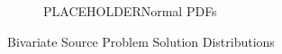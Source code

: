 \begin{figure}[h]
\begin{subfigure}[b]{0.45\textwidth}
   \caption{PLACEHOLDERNormal PDFs}
      \label{norm}
  \end{subfigure}
\caption{Bivariate Source Problem Solution Distributions}
\label{fig:2v sourcepdfs}
\end{figure}


%

